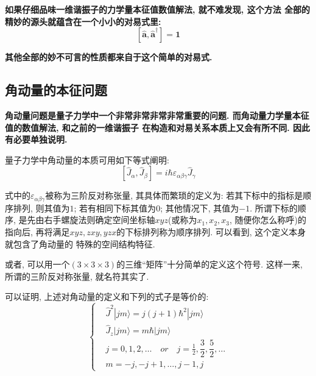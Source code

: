 \documentclass[a4paper, 11pt]{article}
\begin{document}
\begin{spacing}{1.2}
        \textbf{如果仔细品味一维谐振子的力学量本征值数值解法, 就不难发现, 这个方法
        全部的精妙的源头就蕴含在一个小小的对易式里:}
        \begin{equation}
          \mathbf{
          \left[\hat{a}, \hat{a}^{\dagger}\right] = 1}
        \end{equation}
        
        \textbf{其他全部的妙不可言的性质都来自于这个简单的对易式. }

      \subsection{角动量的本征问题}

      \textbf{角动量问题是量子力学中一个非常非常非常非常重要的问题. 而角动量力学量本征值的数值解法, 和之前的一维谐振子
      在构造和对易关系本质上又会有所不同. 因此有必要单独说明.}
      
      量子力学中角动量的本质可用如下等式阐明:
      \begin{equation}
        \left[\hat{J}_{\alpha}, \hat{J}_{\beta}\right] = %
        i\hbar\varepsilon_{\alpha\beta\gamma}\hat{J}_{\gamma}
      \end{equation}

      式中的$\varepsilon_{\alpha\beta\gamma}$被称为三阶反对称张量, 其具体而繁琐的定义为:
      若其下标中的指标是顺序排列, 则其值为$1$; 若有相同下标其值为$0$; 其他情况下, 其值为$-1$.
      所谓下标的顺序, 是先由右手螺旋法则确定空间坐标轴$xyz$(或称为$x_1, x_2, x_3$, 随便你怎么称呼)的指向后, 
      再将满足$xyz, zxy, yzx$的下标排列称为顺序排列. 可以看到, 这个定义本身就包含了角动量的
      特殊的空间结构特征. 

      或者, 可以用一个$(3\times3\times3)$的三维``矩阵''十分简单的定义这个符号. 
      这样一来, 所谓的三阶反对称张量, 就名符其实了. 
      
      可以证明, 上述对角动量的定义和下列的式子是等价的:
      \begin{equation}
        \label{4723:zzsz}
        \left\{
          \begin{aligned}
            &\hat{J}^2|jm\rangle = j(j+1)\hbar^2|jm\rangle\\
            &\hat{J}_z|jm\rangle = m\hbar|jm\rangle \\
            &j = 0,1,2,\ldots \quad or \quad j=\frac{1}{2}, \dfrac{3}{2}, \dfrac{5}{2}, \ldots\\
            &m = -j, -j+1, \ldots, j-1, j
          \end{aligned}\right.
      \end{equation}


\end{spacing}
\end{document}
